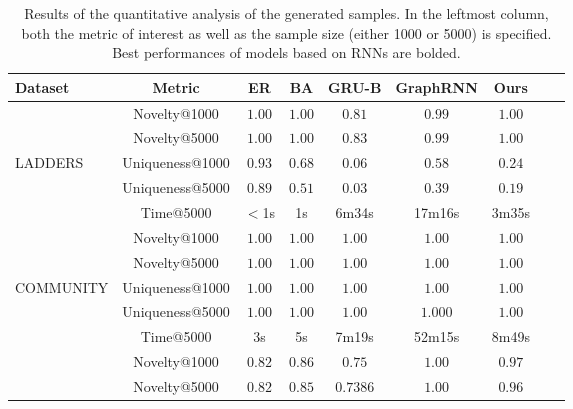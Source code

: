 \begin{table}[h!]
    \footnotesize
    \centering
    \caption{Results of the quantitative analysis of the generated samples. In the leftmost column, both the metric of interest as well as the sample size (either 1000 or 5000) is specified. Best performances of models based on RNNs are bolded.}
    \label{tab:graph-quantitative}
    \renewcommand{\arraystretch}{1.2}
    \begin{tabular}{lcccccccc}
        \toprule
         \textbf{Dataset} & \textbf{Metric} & \textbf{ER} & \textbf{BA} & \textbf{GRU-B} & \textbf{GraphRNN} & \textbf{Ours} \\
         \midrule
          & Novelty@1000              & $\mathbf{1.00}$ & $\mathbf{1.00}$ & $0.81$          & $0.99$          & $\mathbf{1.00}$\\
          & Novelty@5000              & $\mathbf{1.00}$ & $\mathbf{1.00}$ & $0.83$          & $0.99$          & $\mathbf{1.00}$\\
          LADDERS & Uniqueness@1000   & $0.93$ & $0.68$ & $0.06$          & $\mathbf{0.58}$ & $0.24$\\
          & Uniqueness@5000           & $0.89$ & $0.51$ & $0.03$          & $\mathbf{0.39}$ & $0.19$\\
          & Time@5000                 & $<$1s    & 1s       & 6m34s             & 17m16s            & 3m35s\\
         \midrule
          & Novelty@1000              & $\mathbf{1.00}$ & $\mathbf{1.00}$ & $\mathbf{1.00}$ & $\mathbf{1.00}$ & $\mathbf{1.00}$\\
          & Novelty@5000              & $\mathbf{1.00}$ & $\mathbf{1.00}$ & $\mathbf{1.00}$ & $\mathbf{1.00}$ & $\mathbf{1.00}$\\
          COMMUNITY & Uniqueness@1000 & $\mathbf{1.00}$ & $\mathbf{1.00}$ & $\mathbf{1.00}$ & $\mathbf{1.00}$ & $\mathbf{1.00}$\\
          & Uniqueness@5000           & $\mathbf{1.00}$ & $\mathbf{1.00}$ & $\mathbf{1.00}$ & $\mathbf{1.000}$ & $\mathbf{1.00}$\\
          & Time@5000                 & 3s       & 5s       & 7m19s             & 52m15s            & 8m49s\\
         \midrule
          & Novelty@1000              & $0.82$ & $0.86$ & $0.75$          & $\mathbf{1.00}$ & $0.97$\\
          & Novelty@5000              & $0.82$ & $0.85$ & $0.7386$          & $\mathbf{1.00}$ & $0.96$\\

\end{tabular}
\end{table}
